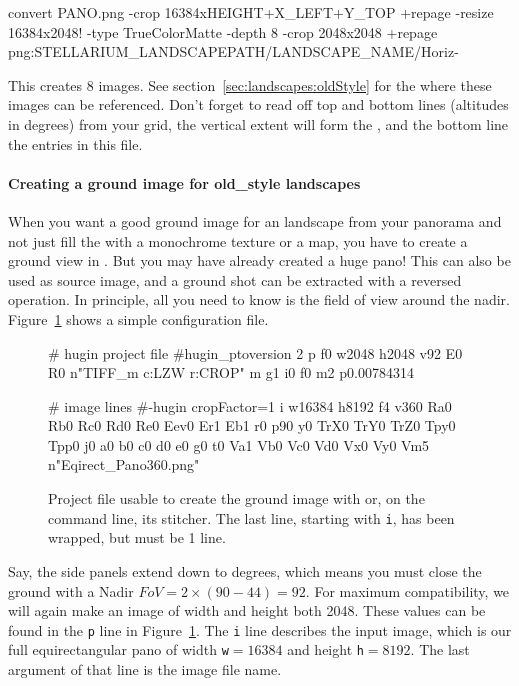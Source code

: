 \begin{commands}
 convert PANO.png  -crop 16384xHEIGHT+X_LEFT+Y_TOP +repage
      -resize 16384x2048!
      -type TrueColorMatte -depth 8
      -crop 2048x2048 +repage
       png:STELLARIUM_LANDSCAPEPATH/LANDSCAPE_NAME/Horiz-%
\end{commands}
%
This creates 8 images. See section~\ref{sec:landscapes:oldStyle} for
the  where these images can be referenced. Don't
forget to read off top and bottom lines (altitudes in degrees) from
your grid, the vertical extent will form the , and
the bottom line the  entries in this file.

\paragraph{Creating a ground image for old\_style landscapes}
When you want a good ground image for an  landscape
from your panorama and not just fill the  with
a monochrome texture or a map, you have to create a ground view in
. But you may have already created a huge pano! This
can also be used as source image, and a ground shot can be extracted
with a reversed operation. In principle, all you need to know is the
field of view around the
nadir. Figure~\ref{fig:landscape:oldStyle:ground_pto} shows a simple
configuration file.

\begin{figure}[ht]
  \centering
\begin{configfile}
# hugin project file
#hugin_ptoversion 2
p f0 w2048 h2048 v92 E0 R0 n"TIFF_m c:LZW r:CROP"
m g1 i0 f0 m2 p0.00784314

# image lines
#-hugin  cropFactor=1
i w16384 h8192 f4 v360 Ra0 Rb0 Rc0 Rd0 Re0 Eev0 Er1 Eb1 r0
  p90 y0 TrX0 TrY0 TrZ0 Tpy0 Tpp0 j0 a0 b0 c0 d0 e0 g0 t0
  Va1 Vb0 Vc0 Vd0 Vx0 Vy0  Vm5 n"Eqirect_Pano360.png"
\end{configfile}
\caption{Project file  usable to create the ground image with
   or, on the command line, its 
  stitcher. The last line, starting with \texttt{i}, has been wrapped,
  but must be 1 line.}
  \label{fig:landscape:oldStyle:ground_pto}
\end{figure}


Say, the side panels extend down to 
degrees, which means you must close the ground with a Nadir
$FoV=2\times(90-44)=92$. For maximum compatibility, we will again make
an image of width and height both 2048\px. These values can be found
in the \texttt{p} line in
Figure~\ref{fig:landscape:oldStyle:ground_pto}.  The \texttt{i} line
describes the input image, which is our full equirectangular pano of
width \texttt{w}$=16384$ and height \texttt{h}$=8192$. The last
argument of that line is the image file name.

